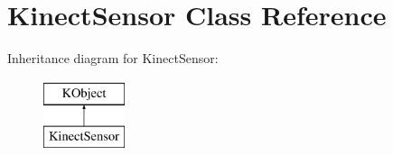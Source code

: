 \hypertarget{class_kinect_sensor}{\section{\-Kinect\-Sensor \-Class \-Reference}
\label{class_kinect_sensor}
}
\-Inheritance diagram for \-Kinect\-Sensor\-:\begin{figure}[H]
\begin{center}
\leavevmode
\includegraphics[height=2.000000cm]{class_kinect_sensor}
\end{center}
\end{figure}
